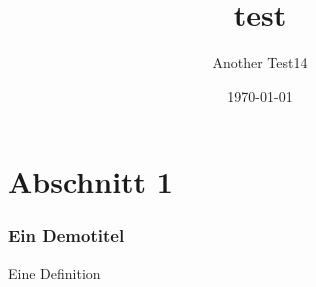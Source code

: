 \documentclass{beamer}
\title{test }
\author{Another Test14}
\date{\today}
\begin{document}
\maketitle
\frame{\tableofcontents[currentsection]}

\section{Abschnitt 1}
\begin{frame} %
  \frametitle{Ein Demotitel} %
  \begin{Definition} %
    Eine Definition
  \end{Definition}
\end{frame}
\end{document}
